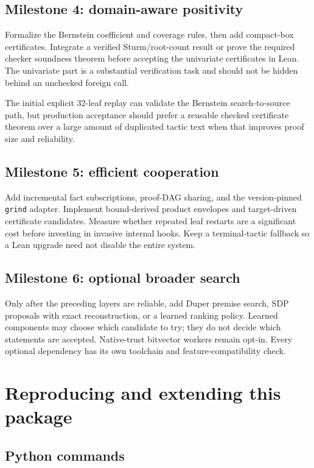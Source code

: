 \documentclass[11pt,a4paper]{article}
\theoremstyle{definition}
\newcommand{\grind}{\texttt{grind}}
\begin{document}
\subsection{Milestone 4: domain-aware positivity}

Formalize the Bernstein coefficient and coverage rules, then add compact-box certificates. Integrate a verified Sturm/root-count result or prove the required checker soundness theorem before accepting the univariate certificates in Lean. The univariate part is a substantial verification task and should not be hidden behind an unchecked foreign call.

The initial explicit 32-leaf replay can validate the Bernstein search-to-source path, but production acceptance should prefer a reusable checked certificate theorem over a large amount of duplicated tactic text when that improves proof size and reliability.

\subsection{Milestone 5: efficient cooperation}

Add incremental fact subscriptions, proof-DAG sharing, and the version-pinned \grind{} adapter. Implement bound-derived product envelopes and target-driven certificate candidates. Measure whether repeated leaf restarts are a significant cost before investing in invasive internal hooks. Keep a terminal-tactic fallback so a Lean upgrade need not disable the entire system.

\subsection{Milestone 6: optional broader search}

Only after the preceding layers are reliable, add Duper premise search, SDP proposals with exact reconstruction, or a learned ranking policy. Learned components may choose which candidate to try; they do not decide which statements are accepted. Native-trust bitvector workers remain opt-in. Every optional dependency has its own toolchain and feature-compatibility check.

\section{Reproducing and extending this package}

\subsection{Python commands}
\end{document}
